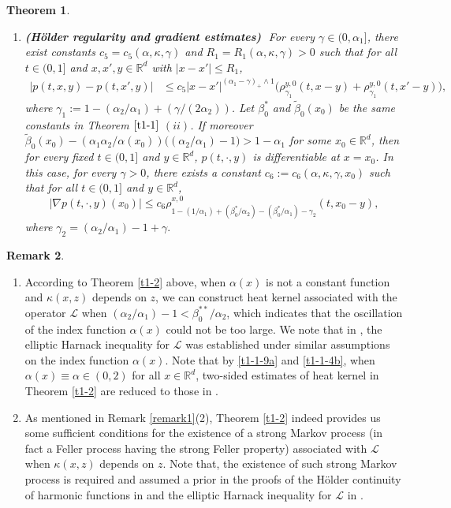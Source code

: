 \documentclass[a4paper,11pt]{amsart}
\renewcommand{\le}{\leqslant}
\newcommand{\R}{\mathds R}
\newcommand{\B}{\beta}
\newcommand{\K}{\kappa}
\newcommand{\A}{\alpha}
\newcommand{\G}{\gamma}
\def\LL{{\mathcal L}}
\newtheorem{theorem}{Theorem}[section]
\theoremstyle{definition}
\newtheorem{remark}[theorem]{Remark}
\begin{document}
\begin{theorem}
\begin{enumerate}
\item[(ii)] {\bf (H\"{o}lder regularity and gradient estimates)}\,\,
For every
$\G \in (0, \A_1]$,
there exist constants
$c_5 =c_5(\A,\K,\G)$ and $R_1 =R_1(\A,\K,\G)>0$ such that for all $t \in (0,1]$ and $x,x',y \in \R^d$ with $|x-x'|\le R_1$,
\begin{equation}\label{t1-1-10}
\begin{split}
 \big|p(t,x,y)-p(t,x',y)\big|
&\le c_5|x-x'|^{(\A_1-\G)_+\wedge 1}
\big(\rho^{y,0}_{\gamma_1}(t,x-y)+ \rho^{y,0}_{\gamma_1}(t,x'-y)\big),
\end{split}
\end{equation}
where $\gamma_1:=1-({\A_2}/{\A_1})+({\G}/({2\A_2}))$.
Let $\B_0^*$ and $\tilde \B_0(x_0)$ be the same constants in
Theorem $\ref{t1-1}$ $(ii)$. If moreover $\tilde \B_0(x_0)-({\A_1\A_2}/{\A(x_0)})
\big(({\A_2}/{\A_1})-1\big)>1-\A_1$ for some
$x_0\in \R^d$, then for every fixed $t \in (0,1]$ and $y \in \R^d$, $p(t,\cdot,y)$ is differentiable
at $x=x_0$. In this case, for every $\G>0$, there exists a constant
$c_6:=c_6(\A,\K,\G, x_0)$ such that for all $ t\in (0,1]$ and $y\in \R^d$,
\begin{equation}\label{t5-1-2}
|\nabla p(t,\cdot,y)(x_0)|\le c_6
\rho^{x,0}_{1-(1/\A_1)+(\B_0^*/\A_2)-(\B_0^*/\A_1)-\G_2}(t,x_0-y),
\end{equation} where $\G_2=(\A_2/\A_1)-1+\G.$
\end{enumerate}
\end{theorem}

\begin{remark}
\begin{enumerate}
\item[(1)] According to Theorem \ref{t1-2} above, when $\A(x)$ is not a constant function and $\K(x,z)$
depends on $z$,
we can construct heat kernel associated with the operator $\LL$ when
$({\A_2}/{\A_1})-1<\B_0^{**}/{\A_2}$, which indicates that
the oscillation of the index function $\A(x)$ could not be too large.
We note that in \cite{BK2}, the elliptic Harnack inequality for $\LL$ was established under similar assumptions on the index function $\A(x)$.
Note that by \eqref{t1-1-9a} and \eqref{t1-1-4b}, when $\A(x)\equiv \A \in (0,2)$ for all $x\in \R^d$, two-sided estimates of heat kernel in Theorem \ref{t1-2} are reduced
to those in \cite{CZ}.

\item[(2)] As mentioned in Remark \ref{remark1}(2), Theorem \ref{t1-2} indeed provides us some sufficient conditions
for the existence of a strong Markov process (in fact a Feller process having the strong Feller property)
associated with $\LL$
when $\K(x,z)$ depends on $z$. Note that, the existence of such
strong Markov process is required and assumed a prior in the proofs of
the H\"{o}lder continuity of harmonic functions in \cite{BK1} and
the elliptic Harnack inequality for $\LL$ in \cite{BK2}.

 \end{enumerate}
\end{remark}
\end{document}
